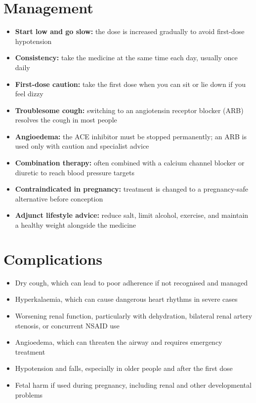 \section*{Management}
\begin{itemize}
    \item \textbf{Start low and go slow:} the dose is increased gradually to avoid first-dose hypotension
    \item \textbf{Consistency:} take the medicine at the same time each day, usually once daily
    \item \textbf{First-dose caution:} take the first dose when you can sit or lie down if you feel dizzy
    \item \textbf{Troublesome cough:} switching to an angiotensin receptor blocker (ARB) resolves the cough in most people
    \item \textbf{Angioedema:} the ACE inhibitor must be stopped permanently; an ARB is used only with caution and specialist advice
    \item \textbf{Combination therapy:} often combined with a calcium channel blocker or diuretic to reach blood pressure targets
    \item \textbf{Contraindicated in pregnancy:} treatment is changed to a pregnancy-safe alternative before conception
    \item \textbf{Adjunct lifestyle advice:} reduce salt, limit alcohol, exercise, and maintain a healthy weight alongside the medicine
\end{itemize}

\section*{Complications}
\begin{itemize}
    \item Dry cough, which can lead to poor adherence if not recognised and managed
    \item Hyperkalaemia, which can cause dangerous heart rhythms in severe cases
    \item Worsening renal function, particularly with dehydration, bilateral renal artery stenosis, or concurrent NSAID use
    \item Angioedema, which can threaten the airway and requires emergency treatment
    \item Hypotension and falls, especially in older people and after the first dose
    \item Fetal harm if used during pregnancy, including renal and other developmental problems
\end{itemize}

